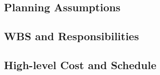 \subsection{Planning Assumptions}
\label{sec:fdsp-slow-cryo-org-assmp}


\subsection{WBS and Responsibilities}
\label{sec:fdsp-slow-cryo-org-wbs}

\subsection{High-level Cost and Schedule}
\label{sec:fdsp-slow-cryo-org-cs}


